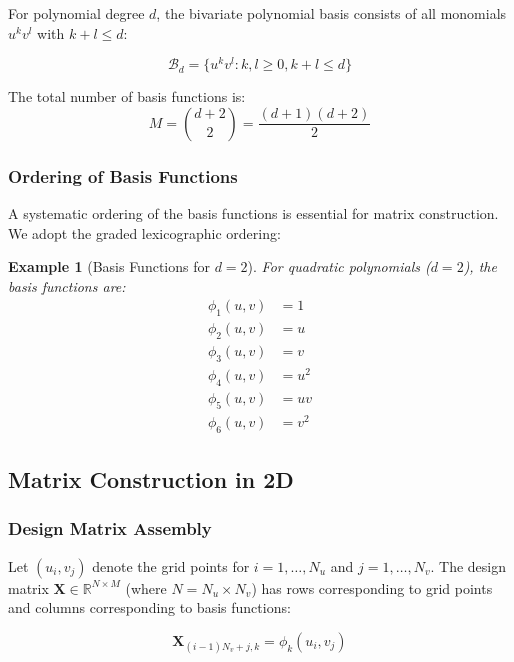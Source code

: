 \documentclass[12pt]{article}
\newtheorem{example}[theorem]{Example}
\begin{document}
For polynomial degree $d$, the bivariate polynomial basis consists of all monomials $u^k v^l$ with $k + l \leq d$:

\begin{equation}
    \mathcal{B}_d = \{u^k v^l : k, l \geq 0, k + l \leq d\}
\end{equation}

The total number of basis functions is:
\begin{equation}
    M = \binom{d+2}{2} = \frac{(d+1)(d+2)}{2}
\end{equation}

\subsubsection{Ordering of Basis Functions}

A systematic ordering of the basis functions is essential for matrix construction. We adopt the graded lexicographic ordering:

\begin{example}[Basis Functions for $d = 2$]
    For quadratic polynomials ($d = 2$), the basis functions are:
    \begin{align}
        \phi_1(u,v) & = 1   \\
        \phi_2(u,v) & = u   \\
        \phi_3(u,v) & = v   \\
        \phi_4(u,v) & = u^2 \\
        \phi_5(u,v) & = uv  \\
        \phi_6(u,v) & = v^2
    \end{align}
\end{example}

\subsection{Matrix Construction in 2D}

\subsubsection{Design Matrix Assembly}

Let $(u_i, v_j)$ denote the grid points for $i = 1, \ldots, N_u$ and $j = 1, \ldots, N_v$. The design matrix $\mathbf{X} \in \mathbb{R}^{N \times M}$ (where $N = N_u \times N_v$) has rows corresponding to grid points and columns corresponding to basis functions:

\begin{equation}
    \mathbf{X}_{(i-1)N_v + j, k} = \phi_k(u_i, v_j)
\end{equation}
\end{document}
